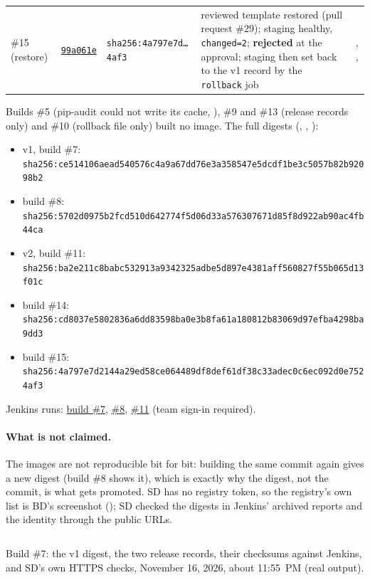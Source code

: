 {\begin{tabularx}{\linewidth}{L{1.2cm}L{1.3cm}L{2.75cm}YL{2.2cm}}
\#15 (restore) & \href{\GiteaRepoURL/commit/99a061e}{\texttt{99a061e}} & \texttt{sha256:}\newline\texttt{4a797e7d\ldots 4af3} & reviewed template restored (pull request \#29); staging healthy, \texttt{changed=2}; \textbf{rejected} at the approval; staging then set back to the v1 record by the \texttt{rollback} job & , , \\
\end{tabularx}
}
Builds \#5 (pip-audit could not write its cache, ), \#9 and \#13 (release records only) and \#10 (rollback file only) built no image. The full digests (, , ):
{\footnotesize\begin{itemize}
\item v1, build \#7: \texttt{sha256:ce514106aead540576c4a9a67dd76e3a358547e5dcdf1be3c5057b82b92098b2}
\item build \#8: \texttt{sha256:5702d0975b2fcd510d642774f5d06d33a576307671d85f8d922ab90ac4fb44ca}
\item v2, build \#11: \texttt{sha256:ba2e211c8babc532913a9342325adbe5d897e4381aff560827f55b065d13f01c}
\item build \#14: \texttt{sha256:cd8037e5802836a6dd83598ba0e3b8fa61a180812b83069d97efba4298ba9dd3}
\item build \#15: \texttt{sha256:4a797e7d2144a29ed58ce064489df8def61df38c33adec0c6ec092d0e7524af3}
\end{itemize}}
Jenkins runs:
\href{https://ci.ssw590-g1.tech/job/twintrack/job/main/7/}{build \#7}, \href{https://ci.ssw590-g1.tech/job/twintrack/job/main/8/}{\#8}, \href{https://ci.ssw590-g1.tech/job/twintrack/job/main/11/}{\#11} (team sign-in required).

\paragraph{What is not claimed.} The images are not reproducible bit for bit: building the same commit again gives a new digest (build \#8 shows it), which is exactly why the digest, not the commit, is what gets promoted.
SD has no registry token, so the registry's own list is BD's screenshot (); SD checked the digests in Jenkins' archived reports and the identity through the public URLs.

\begin{longlisting}
\inputminted[fontsize=\scriptsize]{text}{evidence/176-v1-release-records-same-digest-staging-production-verified-sd-2026-11-16.txt}
\caption{Build \#7: the v1 digest, the two release records, their checksums against Jenkins, and SD's own HTTPS checks, November 16, 2026, about 11:55~PM (real output).}
\label{Listing:E176}
\end{longlisting}

